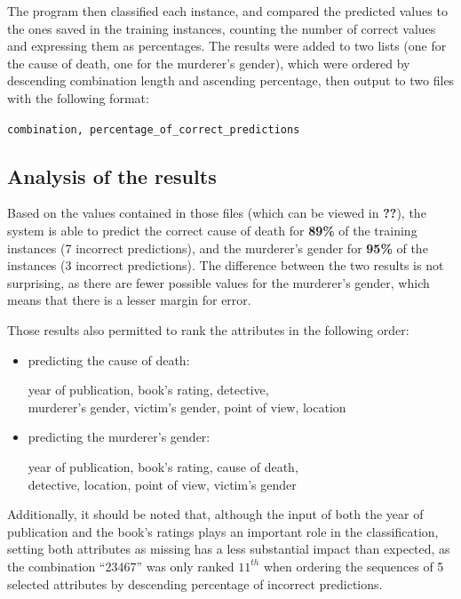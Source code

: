 \documentclass{mproj}
\begin{document}
The program then classified each instance, and compared the predicted values to the ones saved in the training instances, counting the number of correct values and expressing them as percentages. The results were added to two lists (one for the cause of death, one for the murderer's gender), which were ordered by descending combination length and ascending percentage, then output to two files with the following format: 
\begin{center}
	\vspace{-5mm}
	\verb|combination, percentage_of_correct_predictions|
\end{center}

\subsection*{Analysis of the results}

Based on the values contained in those files (which can be viewed in \textbf{??}), the system is able to predict the correct cause of death for \textbf{89\%} of the training instances (7 incorrect predictions), and the murderer's gender for \textbf{95\%} of the instances (3 incorrect predictions). The difference between the two results is not surprising, as there are fewer possible values for the murderer's gender, which means that there is a lesser margin for error.

Those results also permitted to rank the attributes in the following order:
\begin{itemize}[topsep=0pt]
	\item predicting the cause of death:
	\begin{center}
		year of publication, book's rating, detective, \\
		murderer's gender, victim's gender, point of view, location
	\end{center}
	\item predicting the murderer's gender:
	\begin{center}
		year of publication, book's rating, cause of death, \\
		detective, location, point of view, victim's gender
	\end{center}	
\end{itemize}

Additionally, it should be noted that, although the input of both the year of publication and the book's ratings plays an important role in the classification, setting both attributes as missing has a less substantial impact than expected, as the combination ``23467'' was only ranked $11^{th}$ when ordering the sequences of 5 selected attributes by descending percentage of incorrect predictions.
\end{document}
